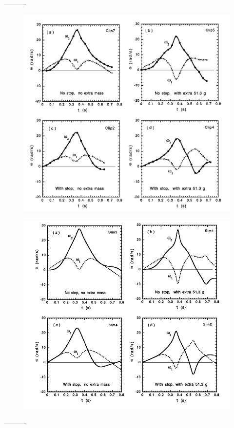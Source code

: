 \documentclass[%
 aip,
 amsmath,amssymb,
 reprint,%
 floatfix,%
]{revtex4-1}
\begin{document}
----------
\begin{figure}[H]
	\centering
	\includegraphics[scale=0.25]{angularvelocities.png}
	\caption{}
\end{figure}

\begin{figure}[H]
	\centering
	\includegraphics[scale=0.25]{analyticalresults.png}
	\caption{}
\end{figure}
----------
\end{document}

